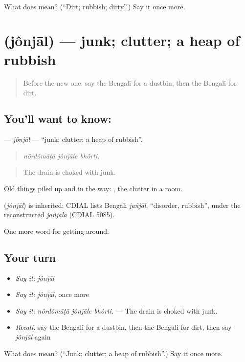 \begin{tcolorbox}[breakable,colback=teal!4,colframe=teal!35!black,title={Before you move on}]
What does  mean? (\textquotedblleft{}Dirt; rubbish; dirty\textquotedblright{}.) Say it once more.
\end{tcolorbox}
\section[\texorpdfstring{\bn{জঞ্জাল} (jônjāl)}{জঞ্জাল (jônjāl)}]{ (jônjāl) — junk; clutter; a heap of rubbish}

\label{lesson:BN-C413-jonjal}



\begin{quote}
Before the new one: say the Bengali for a dustbin, then the Bengali for dirt.
\end{quote}

\subsection*{You'll want to know: }
\textbf{} — \emph{jônjāl} — \textquotedblleft{}junk; clutter; a heap of rubbish\textquotedblright{}.

\begin{quote}
  
\end{quote}

\begin{quote}
\emph{nôrdômāṭā jônjāle bhôrti.}
\end{quote}

\begin{quote}
The drain is choked with junk.
\end{quote}

Old things piled up and in the way:  , the clutter in a room.

\begin{cousinweb}
\textbf{} (\emph{jônjāl}) is inherited: CDIAL lists Bengali \emph{jañjāl}, \textquotedblleft{}disorder, rubbish\textquotedblright{}, under the reconstructed \emph{jañjāla} (CDIAL 5085).
\end{cousinweb}

\begin{grammarlens}[title={What you've built}]
One more word for getting around.
\end{grammarlens}

\subsection*{Your turn}
\begin{itemize}
\raggedright
  \item \emph{Say it:} \emph{jônjāl}
  \item \emph{Say it:} \emph{jônjāl}, once more
  \item \emph{Say it:} \emph{nôrdômāṭā jônjāle bhôrti.} — The drain is choked with junk.
  \item \emph{Recall:} say the Bengali for a dustbin, then the Bengali for dirt, then say \emph{jônjāl} again
\end{itemize}

\begin{tcolorbox}[breakable,colback=teal!4,colframe=teal!35!black,title={Before you move on}]
What does  mean? (\textquotedblleft{}Junk; clutter; a heap of rubbish\textquotedblright{}.) Say it once more.
\end{tcolorbox}
